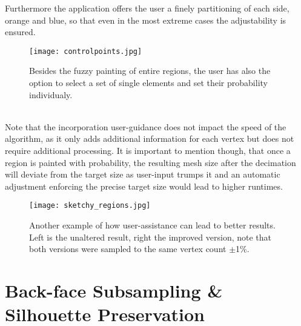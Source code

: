Furthermore the application offers the user a finely partitioning of each side, orange and blue, so that even in the most extreme cases the adjustability is ensured. 
\begin{figure}[ht]
\centering
\texttt{[image: controlpoints.jpg]}
\caption{Besides the fuzzy painting of entire regions, the user has also the option to select a set of single elements and set their probability individualy.}
\label{fig:controlpoints}
\end{figure}\\
Note that the incorporation user-guidance does not impact the speed of the algorithm, as it only adds additional information for each vertex but does not require additional processing.
It is important to mention though, that once a region is painted with probability, the resulting mesh size after the decimation will deviate from the target size as user-input trumps it and an automatic adjustment enforcing the precise target size would lead to higher runtimes. 
\begin{figure}[ht]
\centering
\texttt{[image: sketchy\_regions.jpg]}
\caption{Another example of how user-assistance can lead to better results. Left is the unaltered result, right the improved version, note that both versions were sampled to the same vertex count $\pm$1\%.}
\label{fig:sketchy_regions}
\end{figure}

\newpage
\section{Back-face Subsampling \& Silhouette Preservation}
\label{topstoc41}

